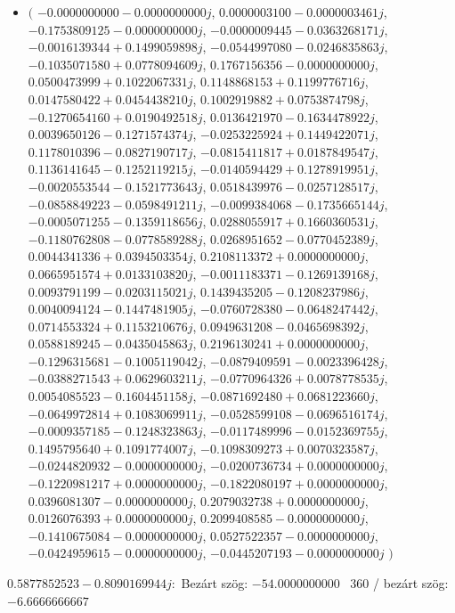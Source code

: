 \documentclass[14pt,a4paper]{article}
\begin{document}
\begin{itemize}
\item
$\big($
$-0.0000000000-0.0000000000j$, $0.0000003100-0.0000003461j$, $-0.1753809125-0.0000000000j$, $-0.0000009445-0.0363268171j$, $-0.0016139344+0.1499059898j$, $-0.0544997080-0.0246835863j$, $-0.1035071580+0.0778094609j$, $0.1767156356-0.0000000000j$, $0.0500473999+0.1022067331j$, $0.1148868153+0.1199776716j$, $0.0147580422+0.0454438210j$, $0.1002919882+0.0753874798j$, $-0.1270654160+0.0190492518j$, $0.0136421970-0.1634478922j$, $0.0039650126-0.1271574374j$, $-0.0253225924+0.1449422071j$, $0.1178010396-0.0827190717j$, $-0.0815411817+0.0187849547j$, $0.1136141645-0.1252119215j$, $-0.0140594429+0.1278919951j$, $-0.0020553544-0.1521773643j$, $0.0518439976-0.0257128517j$, $-0.0858849223-0.0598491211j$, $-0.0099384068-0.1735665144j$, $-0.0005071255-0.1359118656j$, $0.0288055917+0.1660360531j$, $-0.1180762808-0.0778589288j$, $0.0268951652-0.0770452389j$, $0.0044341336+0.0394503354j$, $0.2108113372+0.0000000000j$, $0.0665951574+0.0133103820j$, $-0.0011183371-0.1269139168j$, $0.0093791199-0.0203115021j$, $0.1439435205-0.1208237986j$, $0.0040094124-0.1447481905j$, $-0.0760728380-0.0648247442j$, $0.0714553324+0.1153210676j$, $0.0949631208-0.0465698392j$, $0.0588189245-0.0435045863j$, $0.2196130241+0.0000000000j$, $-0.1296315681-0.1005119042j$, $-0.0879409591-0.0023396428j$, $-0.0388271543+0.0629603211j$, $-0.0770964326+0.0078778535j$, $0.0054085523-0.1604451158j$, $-0.0871692480+0.0681223660j$, $-0.0649972814+0.1083069911j$, $-0.0528599108-0.0696516174j$, $-0.0009357185-0.1248323863j$, $-0.0117489996-0.0152369755j$, $0.1495795640+0.1091774007j$, $-0.1098309273+0.0070323587j$, $-0.0244820932-0.0000000000j$, $-0.0200736734+0.0000000000j$, $-0.1220981217+0.0000000000j$, $-0.1822080197+0.0000000000j$, $0.0396081307-0.0000000000j$, $0.2079032738+0.0000000000j$, $0.0126076393+0.0000000000j$, $0.2099408585-0.0000000000j$, $-0.1410675084-0.0000000000j$, $0.0527522357-0.0000000000j$, $-0.0424959615-0.0000000000j$, $-0.0445207193-0.0000000000j$
$\big)$
\end{itemize}
$0.5877852523-0.8090169944j$:\
Bezárt szög: $-54.0000000000$ \
360 / bezárt szög: $-6.6666666667$\
\end{document}
